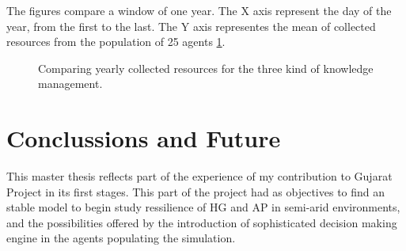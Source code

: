 \documentclass[11pt,oneside,a4paper,openright]{report}
\begin{document}
The figures compare a window of one year. The X axis represent the day of the year, from the first to the last. The Y axis representes the mean of collected resources from the population of 25 agents \ref{fig:expermInfoShar_1}.

\begin{figure}[h!]
\centering
\setlength\fboxsep{0pt}
\setlength\fboxrule{0.5pt}
\caption{ Comparing yearly collected resources for the three kind of knowledge management.}
\label{fig:expermInfoShar_1}
\end{figure}


\chapter{Conclussions and Future}

This master thesis reflects part of the experience of my contribution to Gujarat Project in
its first stages. This part of the project had as objectives to find an stable model to begin
study ressilience of HG and AP in semi-arid environments, and the possibilities offered by the
introduction of sophisticated decision making engine in the agents populating the simulation.
\end{document}
